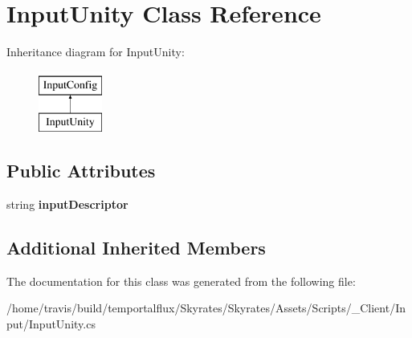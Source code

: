 \hypertarget{class_input_unity}{\section{Input\-Unity Class Reference}
\label{class_input_unity}
}
Inheritance diagram for Input\-Unity\-:\begin{figure}[H]
\begin{center}
\leavevmode
\includegraphics[height=2.000000cm]{class_input_unity}
\end{center}
\end{figure}
\subsection*{Public Attributes}
\begin{DoxyCompactItemize}
\item 
\hypertarget{class_input_unity_a417b8def12f2636885c38e9c515d6567}{string {\bfseries input\-Descriptor}}\label{class_input_unity_a417b8def12f2636885c38e9c515d6567}

\end{DoxyCompactItemize}
\subsection*{Additional Inherited Members}


The documentation for this class was generated from the following file\-:\begin{DoxyCompactItemize}
\item 
/home/travis/build/temportalflux/\-Skyrates/\-Skyrates/\-Assets/\-Scripts/\-\_\-\-Client/\-Input/Input\-Unity.\-cs\end{DoxyCompactItemize}
